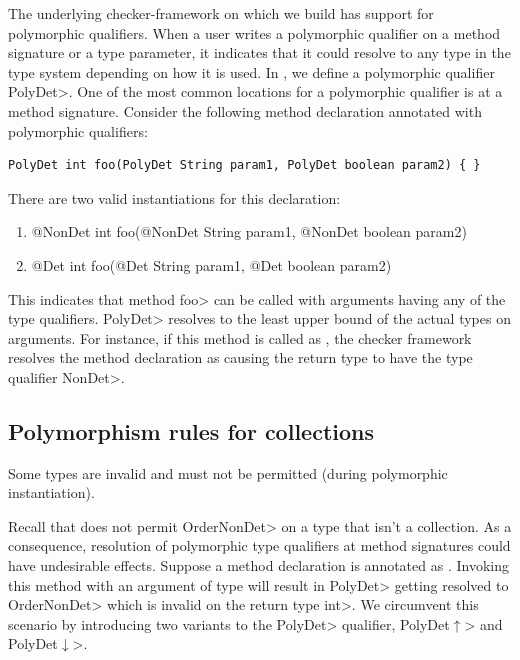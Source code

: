 The underlying checker-framework on which we build \theDeterminismChecker has support for
polymorphic qualifiers. When a user writes a polymorphic qualifier on a method signature or a type parameter,
it indicates that it could resolve to any type in the type system depending on how it is used.
In \theDeterminismChecker, we define a polymorphic qualifier \<PolyDet>.
One of the most common locations for a polymorphic qualifier is at a method signature.
Consider the following method declaration annotated with polymorphic qualifiers:
\begin{verbatim}
PolyDet int foo(PolyDet String param1, PolyDet boolean param2) { }
\end{verbatim}
There are two valid instantiations for this declaration:
\begin{enumerate}
    \item @NonDet int foo(@NonDet String param1, @NonDet boolean param2) { }
    \item @Det int foo(@Det String param1, @Det boolean param2) { }
\end{enumerate}
This indicates that method \<foo> can be called with arguments having any of the  type qualifiers.
 \<PolyDet> resolves to the least upper bound of
the actual types on arguments. For instance, if this method is called as , the 
checker framework resolves the method declaration as 
causing the return type to have the type qualifier \<NonDet>.

\subsection{Polymorphism rules for collections}\label{polymorphism-up-down}

Some types are invalid and must not be permitted (during polymorphic instantiation).

Recall that \theDeterminismChecker does not permit \<OrderNonDet> on a type
that isn't a collection.
As a consequence, resolution of polymorphic type qualifiers at method signatures could have undesirable effects.
Suppose a method declaration is annotated as . Invoking this method
with an argument of type  will result in \<PolyDet> getting resolved to \<OrderNonDet> which is invalid
on the return type \<int>. We circumvent this scenario by introducing two variants to the \<PolyDet> qualifier, \<PolyDet$\uparrow$>
and \<PolyDet$\downarrow$>. 

